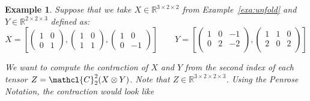 \documentclass[11pt,a4paper,openright,oneside]{book}
\numberwithin{equation}{section}
\newtheorem{example0}[defn0]{Example}
\newenvironment{example}{ \begin{example0}\rm}{\end{example0}}
\newcommand{\exref}[1]{Example~\ref{#1}}
\begin{document}
\begin{example}
    Suppose that we take $X \in \mathbb{R}^{3 \times 2 \times 2}$ from \exref{exa:unfold} and
    $Y \in \mathbb{R}^{2 \times 2 \times 3}$ defined as:
  $$X = \left[\begin{pmatrix}
            1 & 0 \\
            0 & 1
        \end{pmatrix}, 
        \begin{pmatrix}
            1 & 0 \\
            1 & 1
        \end{pmatrix},
        \begin{pmatrix}
            1 & 0 \\
            0 & -1
        \end{pmatrix}
        \right] \qquad
  Y = \left[ 
    \begin{pmatrix}
        1 & 0 & -1 \\
        0 & 2 & -2 \\
    \end{pmatrix},
    \begin{pmatrix}
        1 & 1 & 0 \\
        2 & 0 & 2 \\
    \end{pmatrix}
    \right] $$

    We want to compute the contraction of $X$ and $Y$ from the second index of each tensor $Z = \mathcl{C}_2^2 (X \otimes Y)$.
    Note that $Z \in \mathbb{R}^{3 \times 2 \times 2 \times 3}$. Using the Penrose
    Notation, the contraction would look like

    \begin{center}
    \hfill
\begin{minipage}{0.2\textwidth}
\end{minipage}
\end{center}
\end{example}
\end{document}
